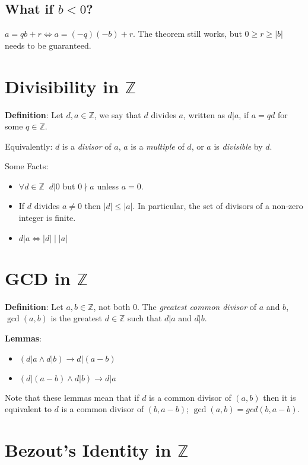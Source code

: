 \documentclass{article}
\begin{document}
\begin{multicols*}{2}
\subsection{What if $b < 0$?}

$a = qb + r \Leftrightarrow a = (-q)(-b) + r$. The theorem still works, but $0 \geq r \geq |b|$ needs to be guaranteed.

\section {Divisibility in $\mathbb{Z}$}

\textbf{Definition}: Let $d, a \in \mathbb{Z}$, we say that $d$ divides $a$, written as $d | a$, if $a = qd$ for some $q \in \mathbb{Z}$.

Equivalently: $d$ is a \textit{divisor} of $a$, $a$ is a \textit{multiple} of $d$, or $a$ is \textit{divisible} by $d$.

Some Facts:
\begin{itemize}
    \item $\forall d \in \mathbb{Z}\;\;d | 0$ but $0 \nmid a$ unless $a = 0$.
    \item If $d$ divides $a \neq 0$ then $|d| \leq |a|$. In particular, the set of divisors of a non-zero integer is finite.
    \item $d|a \Leftrightarrow |d| \;|\; |a|$ 
\end{itemize}

\section {GCD in $\mathbb{Z}$}

\textbf{Definition}: Let $a, b \in \mathbb{Z}$, not both 0. The \textit{greatest common divisor} of $a$ and $b$, $\gcd(a, b)$ is the greatest $d \in \mathbb{Z}$ such that $d | a$ and $d | b$.

\textbf{Lemmas}:
\begin{itemize}
    \item $( d | a \land d | b )\rightarrow d|(a-b)$
    \item $( d | (a-b) \land d | b )\rightarrow d|a$    
\end{itemize}

Note that these lemmas mean that if $d$ is a common divisor of $(a, b)$ then it is equivalent to $d$ is a common divisor of $(b, a-b)$; $\gcd(a, b) = gcd(b, a- b)$.

\section{Bezout's Identity in $\mathbb{Z}$}


\end{multicols*}
\end{document}

